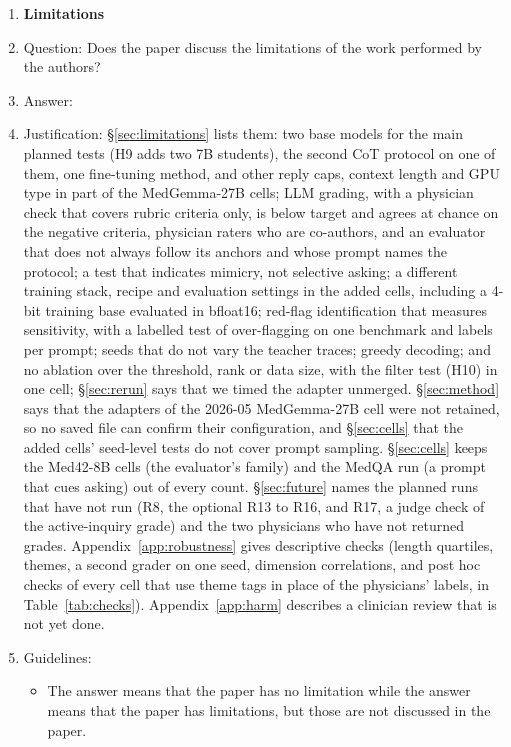 \begin{enumerate}
\item {\bf Limitations}
    \item[] Question: Does the paper discuss the limitations of the work performed by the authors?
    \item[] Answer: \answerYes{}
    \item[] Justification: \S\ref{sec:limitations} lists them: two base models for the main planned tests (H9 adds two 7B students), the second CoT protocol on one of them, one fine-tuning method, and other reply caps, context length and GPU type in part of the MedGemma-27B cells; LLM grading, with a physician check that covers rubric criteria only, is below target and agrees at chance on the negative criteria, physician raters who are co-authors, and an evaluator that does not always follow its anchors and whose prompt names the protocol; a test that indicates mimicry, not selective asking; a different training stack, recipe and evaluation settings in the added cells, including a 4-bit training base evaluated in bfloat16; red-flag identification that measures sensitivity, with a labelled test of over-flagging on one benchmark and labels per prompt; seeds that do not vary the teacher traces; greedy decoding; and no ablation over the threshold, rank or data size, with the filter test (H10) in one cell; \S\ref{sec:rerun} says that we timed the adapter unmerged. \S\ref{sec:method} says that the adapters of the 2026-05 MedGemma-27B cell were not retained, so no saved file can confirm their configuration, and \S\ref{sec:cells} that the added cells' seed-level tests do not cover prompt sampling. \S\ref{sec:cells} keeps the Med42-8B cells (the evaluator's family) and the MedQA run (a prompt that cues asking) out of every count. \S\ref{sec:future} names the planned runs that have not run (R8, the optional R13 to R16, and R17, a judge check of the active-inquiry grade) and the two physicians who have not returned grades. Appendix~\ref{app:robustness} gives descriptive checks (length quartiles, themes, a second grader on one seed, dimension correlations, and post hoc checks of every cell that use theme tags in place of the physicians' labels, in Table~\ref{tab:checks}). Appendix~\ref{app:harm} describes a clinician review that is not yet done.
    \item[] Guidelines:
    \begin{itemize}
        \item The answer \answerNA{} means that the paper has no limitation while the answer \answerNo{} means that the paper has limitations, but those are not discussed in the paper.

\end{itemize}
\end{enumerate}
